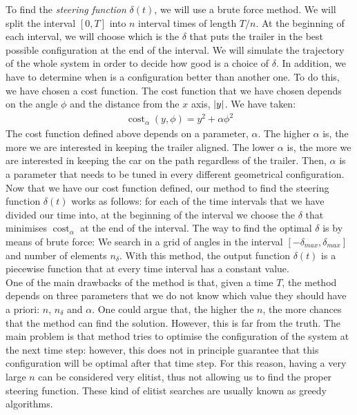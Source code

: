 To find the \textit{steering function} $\delta(t)$, we will use a brute force method. We will split the interval $[0, T]$ into $n$ interval times of length $T/n$. At the beginning of each interval, we will choose which is the $\delta$ that puts the trailer in the best possible configuration at the end of the interval. We will simulate the trajectory of the whole system in order to decide how good is a choice of $\delta$. In addition, we have to determine when is a configuration better than another one. To do this, we have chosen a cost function. The cost function that we have chosen depends on the angle $\phi$ and the distance from the $x$ axis, $\abs{y}$. We have taken:
\begin{align}
    \operatorname{cost}_{\alpha}(y, \phi) = y^2+\alpha\phi^2 
\end{align}
The cost function defined above depends on a parameter, $\alpha$. The higher $\alpha$ is, the more we are interested in keeping the trailer aligned. The lower $\alpha$ is, the more we are interested in keeping the car on the path regardless of the trailer. Then, $\alpha$ is a parameter that needs to be tuned in every different geometrical configuration. \\

Now that we have our cost function defined, our method to find the steering function $\delta(t)$ works as follows: for each of the time intervals that we have divided our time into, at the beginning of the interval we choose the $\delta$ that minimises $\operatorname{cost}_{\alpha}$ at the end of the interval. The way to find the optimal $\delta$ is by means of brute force: We search in a grid of angles in the interval $[-\delta_{max}, \delta_{max}]$ and number of elements $n_{\delta}$. With this method, the output function $\delta(t)$ is a piecewise function that at every time interval has a constant value.\\

One of the main drawbacks of the method is that, given a time $T$, the method depends on three parameters that we do not know which value they should have a priori: $n$, $n_\delta$ and  $\alpha$. One could argue that, the higher the $n$, the more chances that the method can find the solution. However, this is far from the truth. The main problem is that method tries to optimise the configuration of the system at the next time step: however, this does not in principle guarantee that this configuration will be optimal after that time step. For this reason, having a very large $n$ can be considered very elitist, thus not allowing us to find the proper steering function. These kind of elitist searches are usually known as greedy algorithms.\\

